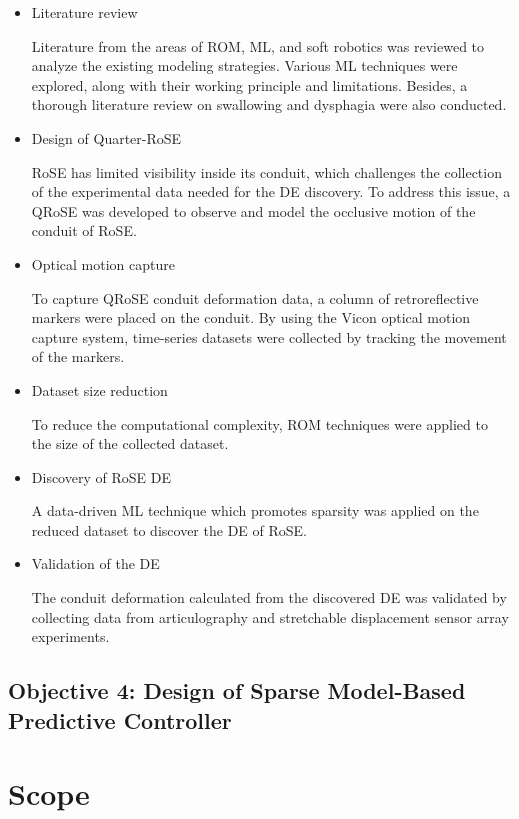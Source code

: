 \begin{itemize}
	\item Literature review
	
	Literature from the areas of \ac{ROM}, ML,
	and soft robotics was reviewed to analyze the existing modeling
	strategies. Various ML techniques were explored, along with their
	working principle and limitations. Besides, a thorough literature
	review on swallowing and dysphagia were also conducted.
	
	\item Design of Quarter-RoSE
	
	\ac{RoSE} has limited visibility inside its conduit, which challenges the
	collection of the experimental data needed for the \ac{DE} discovery.
	To address this issue, a \ac{QRoSE}
	was developed to observe and model the occlusive motion of the
	conduit of \ac{RoSE}.
	
	\item Optical motion capture
	
	To capture \ac{QRoSE} conduit deformation data, a column of retroreflective
	markers were placed on the conduit. By using the Vicon
	optical motion capture system, time-series datasets were collected
	by tracking the movement of the markers.
	
	\item Dataset size reduction
	
	To reduce the computational complexity, \ac{ROM} techniques were
	applied to the size of the collected dataset.
	
	\item Discovery of RoSE DE
	
	A data-driven ML technique which promotes sparsity was applied
	on the reduced dataset to discover the \ac{DE} of \ac{RoSE}.
	
	\item Validation of the DE
	
	The conduit deformation calculated from the discovered \ac{DE} was
	validated by collecting data from articulography and stretchable
	displacement sensor array experiments.
\end{itemize}

\subsection{Objective 4: Design of Sparse Model-Based Predictive Controller}

\section{Scope}

